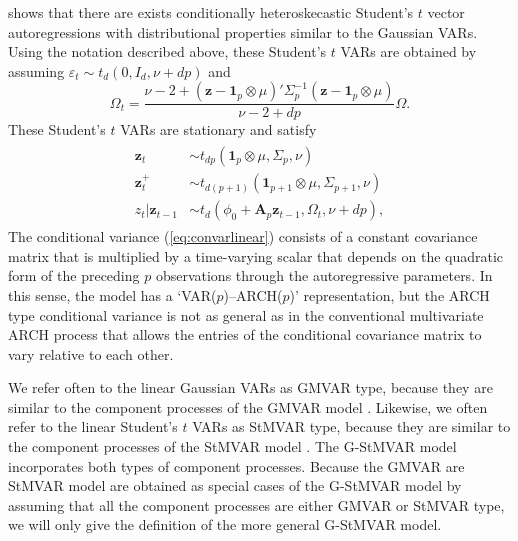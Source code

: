 \documentclass[nojss]{jss} %
\begin{document}
\cite{Virolainen2:2021} shows that there are exists conditionally heteroskecastic Student's $t$ vector autoregressions with distributional properties similar to the Gaussian VARs. Using the notation described above, these Student's $t$ VARs are obtained by assuming $\varepsilon_t\sim t_d(0,I_d,\nu + dp)$ and
\begin{equation}
\Omega_t = \frac{\nu - 2 + (\boldsymbol{z} - \boldsymbol{1}_p\otimes\mu)'\Sigma_p^{-1}(\boldsymbol{z} - \boldsymbol{1}_p\otimes\mu)}{\nu - 2 + dp}\Omega.\label{eq:convarlinear}
\end{equation}
These Student's $t$ VARs are stationary and satisfy \citep[Theorem 1]{Virolainen2:2021}
\begin{align}\label{eq:studentdist}
\begin{aligned}
\boldsymbol{z}_t & \sim t_{dp}(\boldsymbol{1}_p\otimes\mu,\Sigma_{p},\nu) \\
\boldsymbol{z}^{+}_t & \sim t_{d(p+1)}(\boldsymbol{1}_{p+1}\otimes\mu,\Sigma_{p+1},\nu) \\
z_t|\boldsymbol{z}_{t-1} & \sim t_d(\phi_{0} + \boldsymbol{A}_p\boldsymbol{z}_{t-1}, \Omega_t, \nu + dp),
 \end{aligned}
\end{align}
The conditional variance (\ref{eq:convarlinear}) consists of a constant covariance matrix that is multiplied by a time-varying scalar that depends on the quadratic form of the preceding $p$ observations through the autoregressive parameters.  In this sense,  the model has a ‘VAR($p$)–ARCH($p$)’ representation,  but the ARCH type conditional variance is not as general as in the conventional multivariate ARCH process \citep[e.g., ][Section 16.3]{Lutkepohl:2005} that allows the entries of the conditional covariance matrix to vary relative to each other.

We refer often to the linear Gaussian VARs as GMVAR type, because they are similar to the component processes of the GMVAR model \citep{Kalliovirta+Meitz+Saikkonen:2016}. Likewise, we often refer to the linear Student's $t$ VARs as StMVAR type, because they are similar to the component processes of the StMVAR model \citep{Virolainen2:2021}. The G-StMVAR model \citep{Virolainen2:2021} incorporates both types of component processes. Because the GMVAR are StMVAR model are obtained as special cases of the G-StMVAR model by assuming that all the component processes are either GMVAR or StMVAR type, we will only give the definition of the more general G-StMVAR model.
\end{document}
